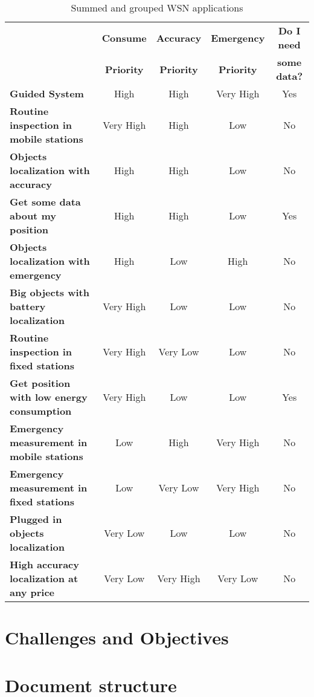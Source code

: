 \begin{table}[h]\footnotesize
\begin{center}
 \begin{tabular}{lcccc}
  \noalign{\vspace*{0.5cm}}
  & \textbf{Consume} & \textbf{Accuracy} & \textbf{Emergency} & \textbf{Do I need} \\
  & \textbf{Priority} & \textbf{Priority} & \textbf{Priority} & \textbf{some data?} \\
  \hline\hline
  \textbf{Guided System} & High & High & Very High & Yes \\
  \hline 
  \textbf{Routine inspection in mobile stations} & Very High & High & Low & No \\
  \hline
  \textbf{Objects localization with accuracy} & High & High & Low & No \\
  \hline
  \textbf{Get some data about my position} & High & High & Low & Yes \\
  \hline
  \textbf{Objects localization with emergency} & High & Low & High & No \\
  \hline
  \textbf{Big objects with battery localization} & Very High & Low & Low & No \\
  \hline
  \textbf{Routine inspection in fixed stations} & Very High & Very Low & Low & No \\
  \hline
  \textbf{Get position with low energy consumption} & Very High & Low & Low & Yes \\
  \hline
  \textbf{Emergency measurement in mobile stations} & Low & High & Very High & No \\
  \hline
  \textbf{Emergency measurement in fixed stations} & Low & Very Low & Very High & No \\
  \hline
  \textbf{Plugged in objects localization} & Very Low & Low & Low & No \\
  \hline
  \textbf{High accuracy localization at any price} & Very Low & Very High & Very Low & No \\
  \hline
  \end{tabular}
 \caption{Summed and grouped \ac{WSN} applications}
 \label{wsn_applications}
\end{center}
\end{table}


\section{Challenges and Objectives}

\section{Document structure}

